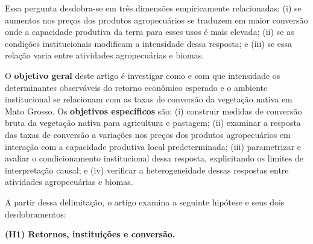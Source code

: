 \medskip

Essa pergunta desdobra-se em três dimensões empiricamente relacionadas: (i) se aumentos nos preços dos produtos agropecuários se traduzem em maior conversão onde a capacidade produtiva da terra para esses usos é mais elevada; (ii) se as condições institucionais modificam a intensidade dessa resposta; e (iii) se essa relação varia entre atividades agropecuárias e biomas. 

O \textbf{objetivo geral} deste artigo é investigar como e com que intensidade os determinantes observáveis do retorno econômico esperado e o ambiente institucional se relacionam com as taxas de conversão da vegetação nativa em Mato Grosso. Os \textbf{objetivos específicos} são: (i) construir medidas de conversão bruta da vegetação nativa para agricultura e pastagem; (ii) examinar a resposta das taxas de conversão a variações nos preços dos produtos agropecuários em interação com a capacidade produtiva local predeterminada; (iii) parametrizar e avaliar o condicionamento institucional dessa resposta, explicitando os limites de interpretação causal; e (iv) verificar a heterogeneidade dessas respostas entre atividades agropecuárias e biomas.



A partir dessa delimitação, o artigo examina a seguinte hipótese e seus dois desdobramentos:

\medskip

\noindent\textbf{(H1) Retornos, instituições e conversão.}

